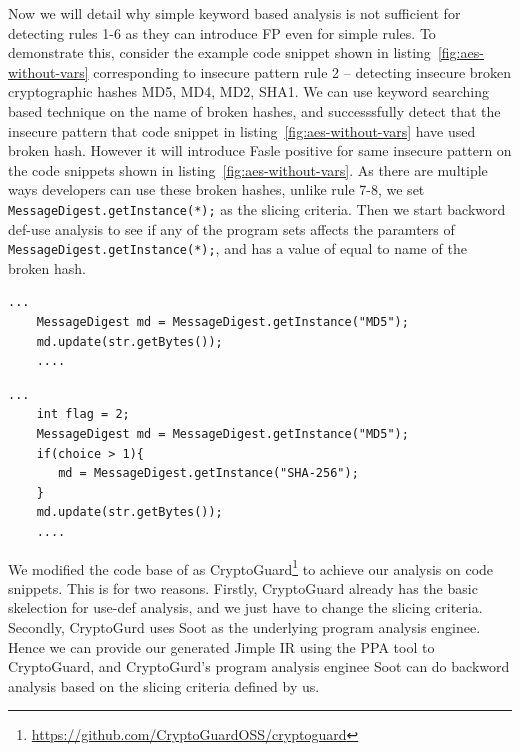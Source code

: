 Now we will detail why simple keyword based analysis is not sufficient for detecting rules 1-6 as they can introduce FP even for simple rules. To demonstrate this, consider the example code snippet shown in listing~\ref{fig:aes-without-vars} corresponding to insecure pattern rule 2 -- detecting insecure broken cryptographic hashes MD5, MD4, MD2, SHA1. We can use keyword searching based technique on the name of broken hashes, and successsfully detect that the insecure pattern that code snippet in listing~\ref{fig:aes-without-vars} have used broken hash. However it will introduce Fasle positive for same insecure pattern on the code snippets shown in listing~\ref{fig:aes-without-vars}.%
As there are multiple ways developers can use these broken hashes, unlike rule 7-8, we set \texttt{MessageDigest.getInstance(*);} as the slicing criteria. Then we start backword def-use analysis to see if any of the program sets affects the paramters of \texttt{MessageDigest.getInstance(*);}, and has a value of equal to name of the broken hash.


\begin{lstlisting}[caption={A code snippet where keyword based detection work well}, label={fig:aes-without-vars}]
    ...
    MessageDigest md = MessageDigest.getInstance("MD5");
    md.update(str.getBytes());
    ....
\end{lstlisting}

\begin{lstlisting}[caption={A code snippet where keyword based detection introduces FP}, label={fig:aes-with-vars}]
    ...
    int flag = 2;
    MessageDigest md = MessageDigest.getInstance("MD5");
    if(choice > 1){
       md = MessageDigest.getInstance("SHA-256");
    }
    md.update(str.getBytes());
    ....
\end{lstlisting}


We modified the code base of  as CryptoGuard\footnote{\url{https://github.com/CryptoGuardOSS/cryptoguard}} to achieve our analysis on code snippets. This is for two reasons. Firstly, CryptoGuard already has the basic skelection for use-def analysis, and we just have to change the slicing criteria. Secondly, CryptoGurd uses Soot as the underlying program analysis enginee. Hence we can provide our generated Jimple IR using the PPA tool to CryptoGuard, and   CryptoGurd's program analysis enginee Soot can do backword analysis based on the slicing criteria defined by us.

